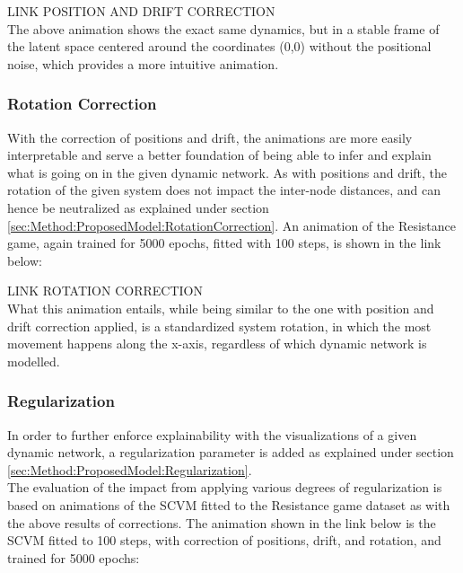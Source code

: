 LINK POSITION AND DRIFT CORRECTION
\\
\noindent
The above animation shows the exact same dynamics, but in a stable frame of the latent space centered around the coordinates (0,0) without the positional noise, which provides a more intuitive animation.


\subsubsection{Rotation Correction}
\label{sec:ResearchQuestion3:RotationCorrection}
With the correction of positions and drift, the animations are more easily interpretable and serve a better foundation of being able to infer and explain what is going on in the given dynamic network.
As with positions and drift, the rotation of the given system does not impact the inter-node distances, and can hence be neutralized as explained under section \ref{sec:Method:ProposedModel:RotationCorrection}.
An animation of the Resistance game, again trained for 5000 epochs, fitted with 100 steps, is shown in the link below:

LINK ROTATION CORRECTION
\\
\noindent
What this animation entails, while being similar to the one with position and drift correction applied, is a standardized system rotation, in which the most movement happens along the x-axis, regardless of which dynamic network is modelled.




\subsubsection{Regularization}
\label{sec:ResearchQuestion3:Regularization}
In order to further enforce explainability with the visualizations of a given dynamic network, a regularization parameter is added as explained under section \ref{sec:Method:ProposedModel:Regularization}.
\\
The evaluation of the impact from applying various degrees of regularization is based on animations of the SCVM fitted to the Resistance game dataset as with the above results of corrections.
The animation shown in the link below is the SCVM fitted to 100 steps, with correction of positions, drift, and rotation, and trained for 5000 epochs:

